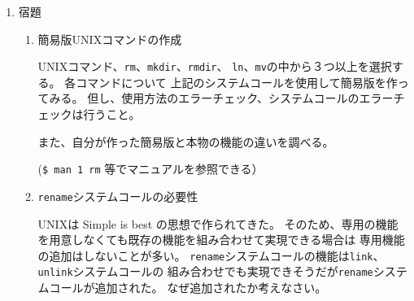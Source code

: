 \documentclass[a4j,dvipdfmx]{jarticle}
\begin{document}
\begin{enumerate}
\begin{lstlisting}[numbers=none]
使用例：
         // シンボリックリンクの読み出し
         char *name = "b.txt";
         char buf[100];
         int n = readlink(name, buf, 99); // シンボリックリンクの内容をbufに読み出す
         if (n<0) {                       // エラーチェック
           perror(name);                  // エラー原因を表示
           exit(1);                       // エラー終了
         }
         buf[n]='\0';                     // C言語型の文字列として完成させる
         printf("%s -> %s\n", name, buf); // ls -s 表示をまねて出力

\end{lstlisting}

\item 宿題

\begin{enumerate}
\item 簡易版UNIXコマンドの作成

UNIXコマンド、{\tt rm}、{\tt mkdir}、{\tt rmdir}、
{\tt ln}、{\tt mv}の中から３つ以上を選択する。
各コマンドについて
上記のシステムコールを使用して簡易版を作ってみる。
但し、使用方法のエラーチェック、システムコールのエラーチェックは行うこと。

また、自分が作った簡易版と本物の機能の違いを調べる。

(\verb/$ man 1 rm/ 等でマニュアルを参照できる）

\item {\tt rename}システムコールの必要性

UNIXは Simple is best の思想で作られてきた。
そのため、専用の機能を用意しなくても既存の機能を組み合わせて実現できる場合は
専用機能の追加はしないことが多い。
{\tt rename}システムコールの機能は{\tt link}、{\tt unlink}システムコールの
組み合わせでも実現できそうだが{\tt rename}システムコールが追加された。
なぜ追加されたか考えなさい。
\end{enumerate}
\end{enumerate}
\end{document}

